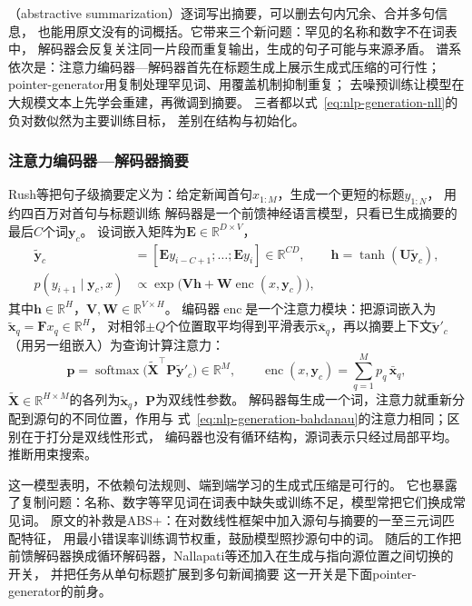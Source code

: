 （abstractive summarization）逐词写出摘要，可以删去句内冗余、合并多句信息，
也能用原文没有的词概括。它带来三个新问题：罕见的名称和数字不在词表中，
解码器会反复关注同一片段而重复输出，生成的句子可能与来源矛盾。
谱系依次是：注意力编码器—解码器首先在标题生成上展示生成式压缩的可行性；
pointer-generator用复制处理罕见词、用覆盖机制抑制重复；
去噪预训练让模型在大规模文本上先学会重建，再微调到摘要。
三者都以式~\eqref{eq:nlp-generation-nll}的负对数似然为主要训练目标，
差别在结构与初始化。

\subsubsection{注意力编码器—解码器摘要}
\label{sec:nlp-generation-rush-abs}

Rush等把句子级摘要定义为：给定新闻首句$x_{1:M}$，生成一个更短的标题$y_{1:N}$，
用约四百万对首句与标题训练
解码器是一个前馈神经语言模型，只看已生成摘要的最后$C$个词$\bm y_c$。
设词嵌入矩阵为$\bm E\in\mathbb{R}^{D\times V}$，
\begin{equation}
  \begin{aligned}
    \tilde{\bm y}_c&=[\bm E y_{i-C+1};\ldots;\bm E y_i]\in\mathbb{R}^{CD},\qquad
    \bm h=\tanh(\bm U\tilde{\bm y}_c),\\
    p(y_{i+1}\mid\bm y_c,x)&\propto\exp\bigl(\bm V\bm h+\bm W\operatorname{enc}(x,\bm y_c)\bigr),
  \end{aligned}
  \label{eq:nlp-generation-rush-decoder}
\end{equation}
其中$\bm h\in\mathbb{R}^{H}$，$\bm V,\bm W\in\mathbb{R}^{V\times H}$。
编码器$\operatorname{enc}$是一个注意力模块：把源词嵌入为$\tilde{\bm x}_q=\bm F x_q\in\mathbb{R}^{H}$，
对相邻$\pm Q$个位置取平均得到平滑表示$\bar{\bm x}_q$，再以摘要上下文$\tilde{\bm y}'_c$
（用另一组嵌入）为查询计算注意力：
\begin{equation}
  \bm p=\operatorname{softmax}\bigl(\tilde{\bm X}^{\top}\bm P\tilde{\bm y}'_c\bigr)\in\mathbb{R}^{M},\qquad
  \operatorname{enc}(x,\bm y_c)=\sum_{q=1}^{M}p_q\,\bar{\bm x}_q,
  \label{eq:nlp-generation-rush-attention}
\end{equation}
$\tilde{\bm X}\in\mathbb{R}^{H\times M}$的各列为$\tilde{\bm x}_q$，$\bm P$为双线性参数。
解码器每生成一个词，注意力就重新分配到源句的不同位置，作用与
式~\eqref{eq:nlp-generation-bahdanau}的注意力相同；区别在于打分是双线性形式，
编码器也没有循环结构，源词表示只经过局部平均。推断用束搜索。

这一模型表明，不依赖句法规则、端到端学习的生成式压缩是可行的。
它也暴露了复制问题：名称、数字等罕见词在词表中缺失或训练不足，模型常把它们换成常见词。
原文的补救是ABS+：在对数线性框架中加入源句与摘要的一至三元词匹配特征，
用最小错误率训练调节权重，鼓励模型照抄源句中的词。
随后的工作把前馈解码器换成循环解码器，Nallapati等还加入在生成与指向源位置之间切换的开关，
并把任务从单句标题扩展到多句新闻摘要
这一开关是下面pointer-generator的前身。

